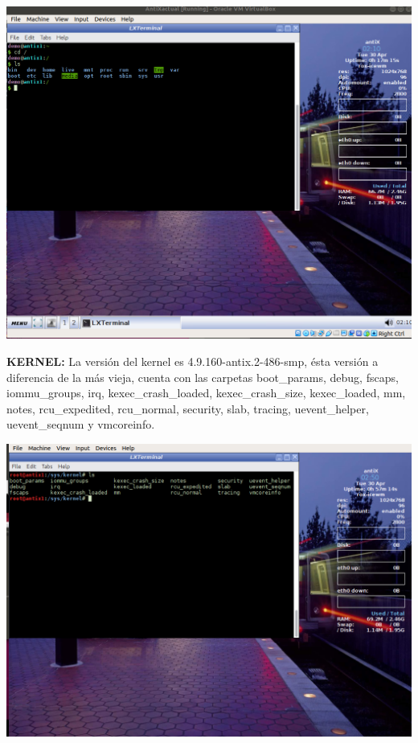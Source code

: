 \documentclass[a4paper, 11pt, oneside]{article}
\begin{document}
\begin{itemize}
    
    \begin{center}
        \includegraphics[scale=0.30]{antix4.png}
    \end{center}
    
     \textbf{KERNEL:} La versión del kernel es 4.9.160-antix.2-486-smp, ésta versión a diferencia de la más vieja, cuenta con las carpetas boot\_params, debug, fscaps, iommu\_groups, irq, kexec\_crash\_loaded, kexec\_crash\_size, kexec\_loaded, mm, notes, rcu\_expedited, rcu\_normal, security, slab, tracing, uevent\_helper, uevent\_seqnum y vmcoreinfo.
     
     \begin{center}
         \includegraphics[scale=0.30]{antix6.png}
     \end{center}
\end{itemize}
\end{document}
